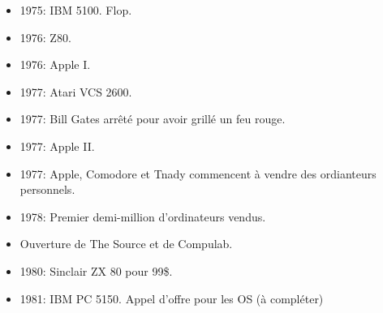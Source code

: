 \documentclass[a4paper,11pt]{article}
\begin{document}
\begin{itemize}
\item 1975: IBM 5100. Flop.

\item 1976: Z80.

\item 1976: Apple I.

\item 1977: Atari VCS 2600.

\item 1977: Bill Gates arrêté pour avoir grillé un feu rouge.

\item 1977: Apple II.

\item 1977: Apple, Comodore et Tnady commencent à vendre des ordianteurs
  personnels.

\item 1978: Premier demi-million d'ordinateurs vendus.

\item Ouverture de The Source et de Compulab.

\item 1980: Sinclair ZX 80 pour 99\$.

\item 1981: IBM PC 5150. Appel d'offre pour les OS (à compléter)

\end{itemize}
\end{document}
